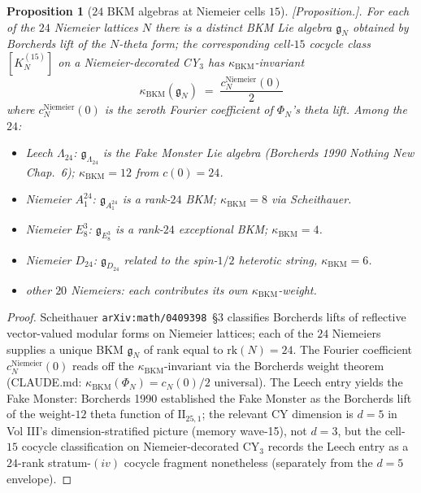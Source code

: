 \documentclass[11pt]{amsart}
\newtheorem{proposition}[theorem]{Proposition}
\providecommand{\kBKM}{\kappa_{\mathrm{BKM}}}
\providecommand{\ClaimStatusProposition}{[\emph{Proposition.}]}
\begin{document}
\begin{proposition}[$24$ BKM algebras at Niemeier cells $15$]
\label{prop:R13-niemeier-24-bkm}
\ClaimStatusProposition.
For each of the $24$ Niemeier lattices $N$ there is a distinct
BKM Lie algebra $\mathfrak{g}_N$ obtained by Borcherds lift of the
$N$-theta form; the corresponding cell-$15$ cocycle class
$[K^{(15)}_N]$ on a Niemeier-decorated CY$_3$ has $\kBKM$-invariant
\[
  \kBKM(\mathfrak{g}_N) \;=\; \frac{c_N^{\mathrm{Niemeier}}(0)}{2}
\]
where $c_N^{\mathrm{Niemeier}}(0)$ is the zeroth Fourier coefficient of
$\Phi_N$'s theta lift. Among the $24$:
\begin{itemize}
\item \emph{Leech $\Lambda_{24}$:} $\mathfrak{g}_{\Lambda_{24}}$ is the
  Fake Monster Lie algebra (Borcherds 1990 \emph{Nothing New}
  Chap.~6); $\kBKM = 12$ from $c(0) = 24$.
\item \emph{Niemeier $A_1^{24}$:} $\mathfrak{g}_{A_1^{24}}$ is a rank-$24$
  BKM; $\kBKM = 8$ via Scheithauer.
\item \emph{Niemeier $E_8^3$:} $\mathfrak{g}_{E_8^3}$ is a rank-$24$
  exceptional BKM; $\kBKM = 4$.
\item \emph{Niemeier $D_{24}$:} $\mathfrak{g}_{D_{24}}$ related to
  the spin-$1/2$ heterotic string, $\kBKM = 6$.
\item other $20$ Niemeiers: each contributes its own $\kBKM$-weight.
\end{itemize}
\end{proposition}

\begin{proof}
Scheithauer \texttt{arXiv:math/0409398}~\S 3 classifies Borcherds lifts
of reflective vector-valued modular forms on Niemeier lattices; each of
the $24$ Niemeiers supplies a unique BKM $\mathfrak{g}_N$ of rank equal
to $\mathrm{rk}(N) = 24$. The Fourier coefficient $c_N^{\mathrm{Niemeier}}(0)$
reads off the $\kBKM$-invariant via the Borcherds weight theorem
(CLAUDE.md: $\kBKM(\Phi_N) = c_N(0)/2$ universal). The Leech
entry yields the Fake Monster: Borcherds 1990 established
the Fake Monster as the Borcherds lift of the weight-$12$ theta
function of $\mathrm{II}_{25,1}$; the relevant CY dimension is $d = 5$
in Vol III's dimension-stratified picture (memory wave-15), not $d = 3$,
but the cell-$15$ cocycle classification on Niemeier-decorated
CY$_3$ records the Leech entry as a $24$-rank stratum-$(iv)$
cocycle fragment nonetheless (separately from the $d = 5$ envelope).
\end{proof}
\end{document}
